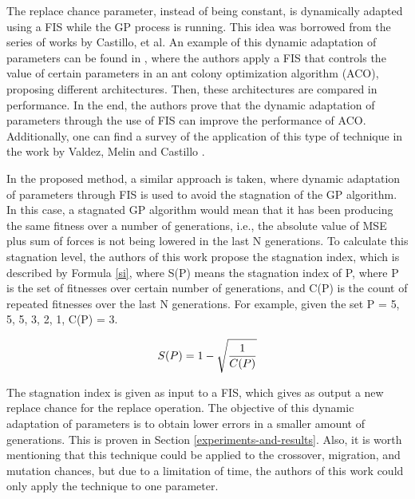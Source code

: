 \documentclass[a4paper,twoside]{article}
\begin{document}

The replace chance parameter, instead of being constant, is
dynamically adapted using a FIS while the GP process is running. This
idea was borrowed from the series of works by Castillo, et al. An
example of this dynamic adaptation of parameters can be found in
\cite{castillo2015new}, where the authors apply a FIS that controls
the value of certain parameters in an ant colony optimization
algorithm (ACO), proposing different architectures. Then, these
architectures are compared in performance. In the end, the authors
prove that the dynamic adaptation of parameters through the use of FIS
can improve the performance of ACO. Additionally, one can find a
survey of the application of this type of technique in the work by
Valdez, Melin and Castillo \cite{valdez2014survey}. 

In the proposed method, a similar approach is taken, where dynamic
adaptation of parameters through FIS is used to avoid the stagnation
of the GP algorithm. In this case, a stagnated GP algorithm would mean
that it has been producing the same fitness over a number of
generations, i.e., the absolute value of MSE plus sum of forces is not
being lowered in the last N generations. To calculate this stagnation
level, the authors of this work propose the stagnation index, which is
described by Formula \ref{si}, where S(P) means the stagnation index
of P, where P is the set of fitnesses over certain number of
generations, and C(P) is the count of repeated fitnesses over the last
N generations. For example, given the set P = {5, 5, 5, 3, 2, 1}, C(P)
= 3. 

\begin{equation} \label{si}
S(P) = 1 - \sqrt{1 \over C(P)}
\end{equation}

The stagnation index is given as input to a FIS, which gives as output
a new replace chance for the replace operation. The objective of this
dynamic adaptation of parameters is to obtain lower errors in a
smaller amount of generations. This is proven in Section
\ref{experiments-and-results}. Also, it is worth mentioning that this
technique could be applied to the crossover, migration, and mutation
chances, but due to a limitation of time, the authors of this work
could only apply the technique to one parameter. 
\end{document}
